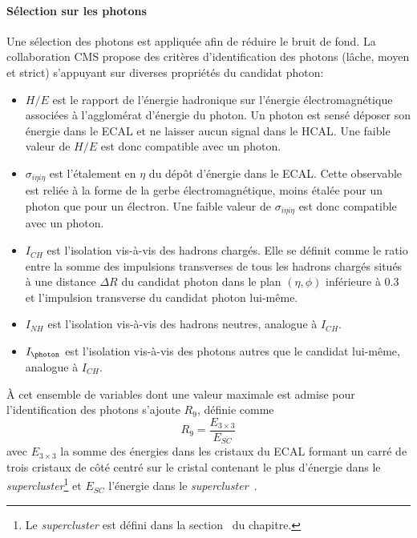 \paragraph{Sélection sur les photons}
Une sélection des photons est appliquée afin de réduire le bruit de fond.
La collaboration CMS propose des critères d'identification des photons (lâche, moyen et strict) s'appuyant sur diverses propriétés du \og candidat \fg{} photon:
\begin{itemize}
\item $H/E$ est le rapport de l'énergie hadronique sur l'énergie électromagnétique associées à l'agglomérat d'énergie du photon.
Un photon est sensé déposer son énergie dans le ECAL et ne laisser aucun signal dans le HCAL.
Une faible valeur de $H/E$ est donc compatible avec un photon.
\item $\sigma_{i\eta i\eta}$ est l'étalement en $\eta$ du dépôt d'énergie dans le ECAL.
Cette observable est reliée à la forme de la gerbe électromagnétique, moins étalée pour un photon que pour un électron.
Une faible valeur de $\sigma_{i\eta i\eta}$ est donc compatible avec un photon.
\item $I_{CH}$ est l'isolation vis-à-vis des hadrons chargés.
Elle se définit comme le ratio entre la somme des impulsions transverses de tous les hadrons chargés situés à une distance $\Delta R$ du candidat photon dans le plan $(\eta,\phi)$ inférieure à \num{0.3} et l'impulsion transverse du candidat photon lui-même.
\item $I_{NH}$ est l'isolation vis-à-vis des hadrons neutres, analogue à $I_{CH}$.
\item $I_{\photon}$ est l'isolation vis-à-vis des photons autres que le candidat lui-même, analogue à $I_{CH}$.
\end{itemize}
À cet ensemble de variables dont une valeur maximale est admise pour l'identification des photons s'ajoute $R_9$, définie comme
\begin{equation}
R_9 = \frac{E_{3\times3}}{E_{SC}}
\label{eq-R9_definition}
\end{equation}
avec
$E_{3\times3}$ la somme des énergies dans les cristaux du ECAL formant un carré de trois cristaux de côté centré sur le cristal contenant le plus d'énergie dans le \emph{supercluster}\footnote{Le \emph{supercluster} est défini dans la section~ du chapitre.}
et
$E_{SC}$
l'énergie dans le \emph{supercluster}~\cite{photon_ID_2015}.
